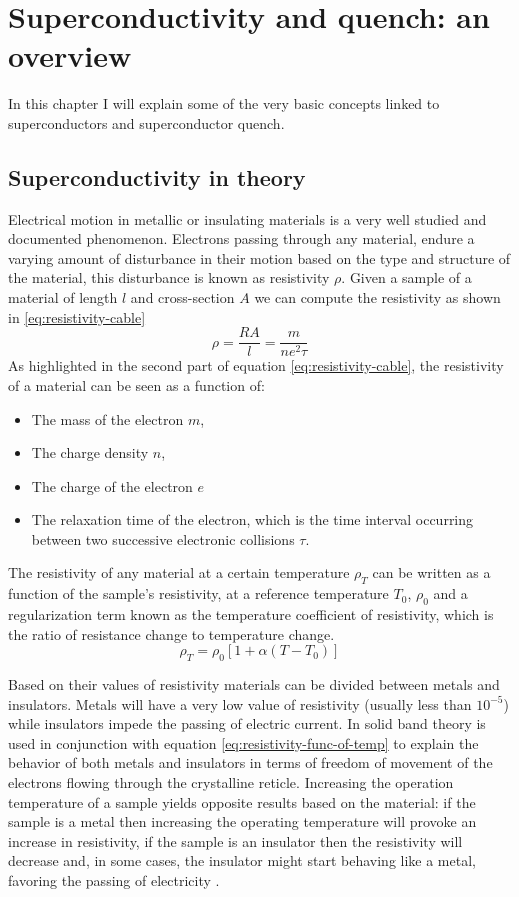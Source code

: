 \chapter{Superconductivity and quench: an overview}
\label{chp:soupcond-quench}
In this chapter I will explain some of the very basic concepts linked to superconductors and
superconductor quench.
\section{Superconductivity in theory}
\label{sec:soupcond}
Electrical motion in metallic or insulating materials is a very well studied and documented
phenomenon. Electrons passing through any material, endure a varying amount of disturbance in their
motion based on the type and structure of the material, this disturbance is known as resistivity $\rho$.
Given a sample of a material of length $l$ and cross-section $A$ we can compute the resistivity as
shown in \ref{eq:resistivity-cable}
\begin{equation}
	\label{eq:resistivity-cable}
	\rho = \frac{RA}{l} = \frac{m}{ne^2\tau}
\end{equation}
As highlighted in the second part of equation \ref{eq:resistivity-cable}, the resistivity of a
material can be seen as a function of:
\begin{itemize}
	\item The mass of the electron $m$,
	\item The charge density $n$,
	\item The charge of the electron $e$
	\item The relaxation time of the electron, which is the time interval occurring between two
	      successive electronic collisions $\tau$.
\end{itemize}

The resistivity of any material at a certain temperature $\rho_T$ can be written as a function of
the sample's resistivity, at a reference temperature $T_0$, $\rho_0$ and a regularization term
known as the temperature coefficient of resistivity, which is the ratio of resistance change to
temperature change.
\begin{equation}
	\label{eq:resistivity-func-of-temp}
	\rho_T = \rho_0[1 + \alpha(T - T_0)]
\end{equation}

Based on their values of resistivity materials can be divided between metals and insulators. Metals
will have a very low value of resistivity (usually less than $10^{-5}$) while insulators impede the
passing of electric current.
In \cite{slimani2022superconducting} solid band theory is used in conjunction with equation
\ref{eq:resistivity-func-of-temp} to explain the behavior of both metals and insulators in terms of
freedom of movement of the electrons flowing through the crystalline reticle. Increasing the
operation temperature of a sample yields opposite results based on the material: if the sample is a
metal then increasing the operating temperature will provoke an increase in resistivity, if the
sample is an insulator then the resistivity will decrease and, in some cases, the insulator might
start behaving like a metal, favoring the passing of electricity \cite{slimani2022superconducting}.

